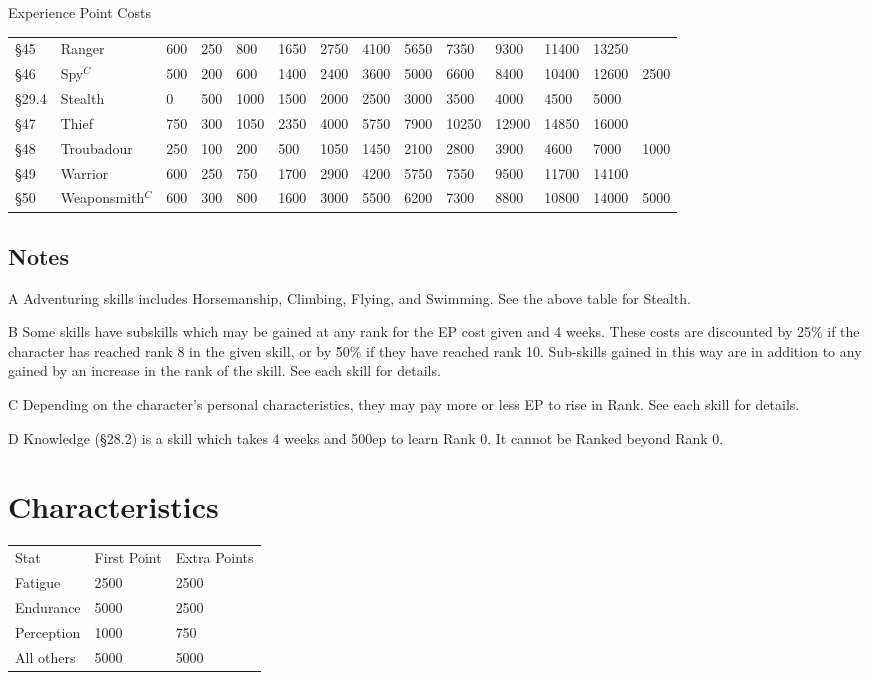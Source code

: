 \begin{Tables}{Experience Point Costs}
\begin{tabularx}{\linewidth}{llllllllllllll}
§45	& Ranger		& 600	& 250	& 800	& 1650	& 2750	& 4100	& 5650	& 7350	& 9300	& 11400	& 13250	&	\\
§46	& Spy$^C$		& 500	& 200	& 600	& 1400	& 2400	& 3600	& 5000	& 6600	& 8400	& 10400	& 12600	& 2500	\\
§29.4	& Stealth		& 0	& 500	& 1000	& 1500	& 2000	& 2500	& 3000	& 3500	& 4000	& 4500	& 5000	&	\\
§47	& Thief			& 750	& 300	& 1050	& 2350	& 4000	& 5750	& 7900	& 10250	& 12900	& 14850	& 16000	& 	\\
§48	& Troubadour		& 250	& 100	& 200	& 500	& 1050	& 1450	& 2100	& 2800	& 3900	& 4600	& 7000	& 1000	\\
§49	& Warrior		& 600	& 250	& 750	& 1700	& 2900	& 4200	& 5750	& 7550	& 9500	& 11700	& 14100	& 	\\
§50	& Weaponsmith$^C$	& 600	& 300	& 800	& 1600	& 3000	& 5500	& 6200	& 7300	& 8800	& 10800	& 14000	& 5000	\\
\end{tabularx}

\subsection{Notes}

\begin{Description}
\item[A] Adventuring skills includes Horsemanship, Climbing, Flying, and
Swimming. See the above table for Stealth.

\item[B] Some skills have subskills which may be gained at any rank
  for the EP cost given and 4 weeks.  These costs are discounted by
  25\% if the character has reached rank 8 in the given skill, or by
  50\% if they have reached rank 10. Sub-skills gained in this way are
  in addition to any gained by an increase in the rank of the
  skill. See each skill for details.

\item[C] Depending on the character’s personal characteristics, they
  may pay more or less EP to rise in Rank. See each skill for details.

\item[D] Knowledge (§28.2) is a skill which takes 4 weeks and 500ep to
  learn Rank 0.  It cannot be Ranked beyond Rank 0.
\end{Description}


\section{Characteristics}

\begin{tabularx}{\linewidth}{XXX}
Stat		& First Point	& Extra Points  \\
Fatigue		& 2500		& 2500 \\
Endurance	& 5000		& 2500 \\
Perception	& 1000		& 750 \\
All others	& 5000		& 5000 \\
\end{tabularx}
\end{Tables}

